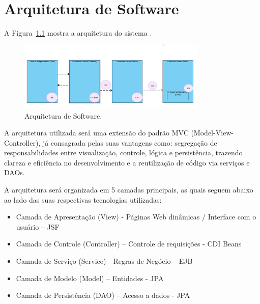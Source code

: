 
\chapter{Arquitetura de Software}
\label{sec-arquitetura}
\vspace{-1cm}

A Figura~\ref{arq} mostra a arquitetura do sistema \emph{\imprimirtitulo}.

\begin{figure}[h]
	\centering
	\includegraphics[width=0.8\textwidth]{figuras/arq.png}
	\caption{Arquitetura de Software.}
	\label{arq}
\end{figure}

A arquitetura utilizada será uma extensão do padrão MVC (Model-View-Controller), já consagrada pelas suas vantagens como: segregação de responsabilidades entre visualização, controle, lógica e persistência, trazendo clareza e eficiência no desenvolvimento e a reutilização de código via serviços e DAOs.

A arquitetura será organizada em 5 camadas principais, as quais seguem abaixo ao lado das suas respectivas tecnologias utilizadas:

\begin{itemize}
    \item Camada de Apresentação (View) - Páginas Web dinâmicas / Interface com o usuário – JSF
    \item Camada de Controle (Controller) – Controle de requisições - CDI Beans
    \item Camada de Serviço (Service) - Regras de Negócio – EJB
    \item Camada de Modelo (Model) – Entidades - JPA
    \item Camada de Persistência (DAO) – Acesso a dados - JPA
\end{itemize}



